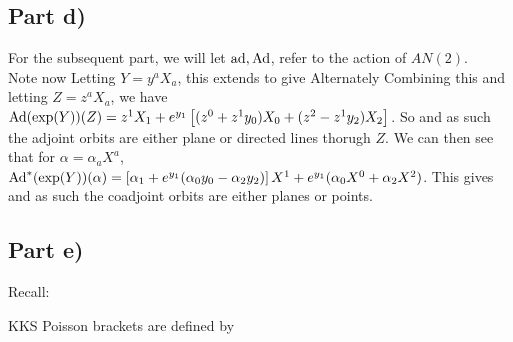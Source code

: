 \documentclass{article}
\begin{document}
\subsection{Part d)}
For the subsequent part, we will let $\operatorname{ad}, \operatorname{Ad}$, refer to the action of $AN(2)$. \\
Note now
Letting $Y = y^a X_a$,  this extends to give  
Alternately 
Combining this and letting $Z = z^a X_a$, we have $\operatorname{Ad}(\exp(Y))(Z)=  z^1X_1 + e^{y_1}\left[ (z^0 + z^1 y_0)X_0 + (z^2 - z^1 y_2)X_2 \right]$. So
and as such the adjoint orbits are either plane or directed lines thorugh $Z$. We can then see that for $\alpha = \alpha_a X^a$, $\operatorname{Ad}^\ast(\exp(Y))(\alpha) = \left[ \alpha_1 + e^{y_1}(\alpha_0 y_0 -\alpha_2 y_2) \right]X^1 + e^{y_1}(\alpha_0 X^0 + \alpha_2 X^2)$. This gives
and as such the coadjoint orbits are either planes or points. 
\subsection{Part e)}
Recall:
\begin{definition}
KKS Poisson brackets are defined by 
\end{definition}
\end{document}

